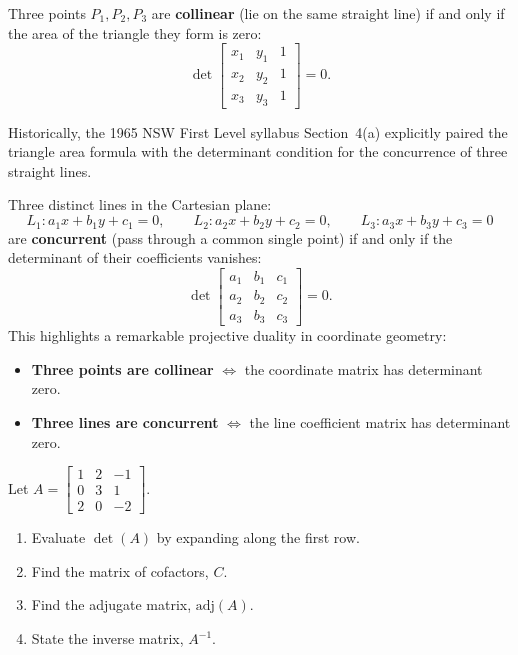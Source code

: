 \begin{remark}
Three points $P_1, P_2, P_3$ are \textbf{collinear} (lie on the same straight line) if and only if the area of the triangle they form is zero:
\[
\det \begin{bmatrix} x_1 & y_1 & 1 \\ x_2 & y_2 & 1 \\ x_3 & y_3 & 1 \end{bmatrix} = 0.
\]
\end{remark}

\begin{remark}
Historically, the 1965 NSW First Level syllabus Section~4(a) explicitly paired the triangle area formula with the determinant condition for the concurrence of three straight lines.

Three distinct lines in the Cartesian plane:
\[
L_1: a_1 x + b_1 y + c_1 = 0, \qquad
L_2: a_2 x + b_2 y + c_2 = 0, \qquad
L_3: a_3 x + b_3 y + c_3 = 0
\]
are \textbf{concurrent} (pass through a common single point) if and only if the determinant of their coefficients vanishes:
\[
\det \begin{bmatrix} a_1 & b_1 & c_1 \\ a_2 & b_2 & c_2 \\ a_3 & b_3 & c_3 \end{bmatrix} = 0.
\]
This highlights a remarkable projective duality in coordinate geometry:
\begin{itemize}[leftmargin=*]
  \item \textbf{Three points are collinear} $\iff$ the coordinate matrix has determinant zero.
  \item \textbf{Three lines are concurrent} $\iff$ the line coefficient matrix has determinant zero.
\end{itemize}
\end{remark}

\bigskip

\begin{problem}
Let $A = \begin{bmatrix} 1 & 2 & -1 \\ 0 & 3 & 1 \\ 2 & 0 & -2 \end{bmatrix}$.

\begin{enumerate}[label=\textbf{(\alph*)}]
  \item Evaluate $\det(A)$ by expanding along the first row.
  \item Find the matrix of cofactors, $C$.
  \item Find the adjugate matrix, $\text{adj}(A)$.
  \item State the inverse matrix, $A^{-1}$.
\end{enumerate}
\end{problem}

